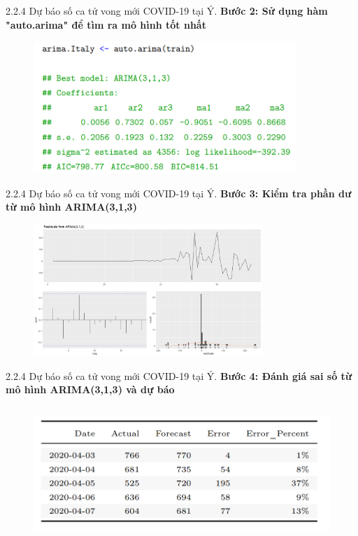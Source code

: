 \documentclass[notheorems,envcountsect,hyperref=unicode]{beamer}
\begin{document}
\begin{frame}{2.2.4 Dự báo số ca tử vong mới COVID-19 tại Ý.}
\textbf{Bước 2: Sử dụng hàm "auto.arima" để tìm ra mô hình tốt nhất}\\
	\begin{figure}[!htb]
		\centering
		\includegraphics[width=1\linewidth,height=5cm]{duong5} 
	\end{figure}
\end{frame}

\begin{frame}{2.2.4 Dự báo số ca tử vong mới COVID-19 tại Ý.}
\textbf{Bước 3: Kiểm tra phần dư từ mô hình ARIMA(3,1,3)}\\
	\begin{figure}[!htb]
		\centering
		\includegraphics[width=1\linewidth,height=5cm]{PD1} 
	\end{figure}
\end{frame}

\begin{frame}{2.2.4 Dự báo số ca tử vong mới COVID-19 tại Ý.}
\textbf{Bước 4: Đánh giá sai số từ mô hình ARIMA(3,1,3) và dự báo}\\
	\begin{figure}[!htb]
		\centering
		\includegraphics[width=1\linewidth,height=5cm]{duong6} 
	\end{figure}
\end{frame}
\end{document}
